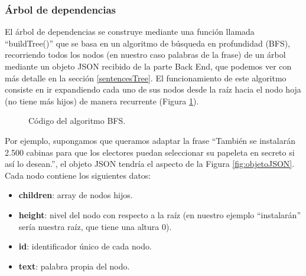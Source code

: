 \subsubsection{Árbol de dependencias}
	El árbol de dependencias se construye mediante una función llamada ``buildTree()'' que se basa en un algoritmo de búsqueda en profundidad (BFS), recorriendo todos los nodos (en nuestro caso palabras de la frase) de un árbol mediante un objeto JSON recibido de la parte Back End, que podemos ver con más detalle en la sección \ref{sentencesTree}. El funcionamiento de este algoritmo consiste en ir expandiendo cada uno de sus nodos desde la raíz hacia el nodo hoja (no tiene más hijos) de manera recurrente (Figura \ref{fig:algoritmoBFS}).
	
		\begin{figure}[h!]
		\centering
		
		
		
		
		\caption{Código del algoritmo BFS.}
		\label{fig:algoritmoBFS}
	\end{figure}

	Por ejemplo, supongamos que queramos adaptar la frase ``También se instalarán 2.500 cabinas para que los electores puedan seleccionar su papeleta en secreto si así lo desean.'', el objeto JSON tendría el aspecto de la Figura \ref{fig:objetoJSON}. 
	Cada nodo contiene los siguientes datos:
	\begin{itemize}
		\item \textbf{children}: array de nodos hijos.
		\item \textbf{height}: nivel del nodo con respecto a la raíz (en nuestro ejemplo ``instalarán'' sería nuestra raíz, que tiene una altura 0).
		\item \textbf{id}: identificador único de cada nodo.
		\item \textbf{text}: palabra propia del nodo.
	\end{itemize}

